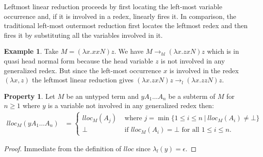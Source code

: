\documentclass{article}
\theoremstyle{definition}
\newtheorem{property}{Property}[section]
\newtheorem{example}{Example}[section]
\begin{document}
Leftmost linear reduction proceeds by first locating the left-most variable occurrence and, if it is involved in a redex, linearly fires it. In comparison, the traditional left-most outermost reduction first locates the leftmost redex and then fires it by substituting all the variables involved in it.

\begin{example}
Take $M = (\lambda x. x x N) z$. We have $M \rightarrow_{hl} (\lambda x. z x N) z$ which is in quasi head normal form because the head variable $z$ is not involved in any generalized redex.
But since the left-most occurrence $x$ is involved in the redex $(\lambda x, z)$ the leftmost linear reduction gives $(\lambda x. z x N) z \rightarrow_l (\lambda x. z z N) z$.
\end{example}

\begin{property}
    \label{prop:qnf_longapply}
    Let $M$ be an untyped term and $y A_1 \ldots A_n$ be a subterm of $M$ for $n\geq1$ where $y$ is a variable not involved in any generalized redex then:
    \begin{align*}
    lloc_M(y A_1 \ldots A_n) &=
        \begin{cases}
         lloc_M (A_j) &\mbox{ where } j = \min \{ 1\leq i\leq n \ | \ lloc_M (A_i) \neq \bot\} \\
         \bot &\mbox{ if } lloc_M(A_i) = \bot \mbox{ for all } 1\leq i\leq n.
        \end{cases}
    \end{align*}
    \end{property}
    \begin{proof}
    Immediate from the definition of $lloc$ since $\lambda_l(y) = \epsilon$.
    \end{proof}
\end{document}
